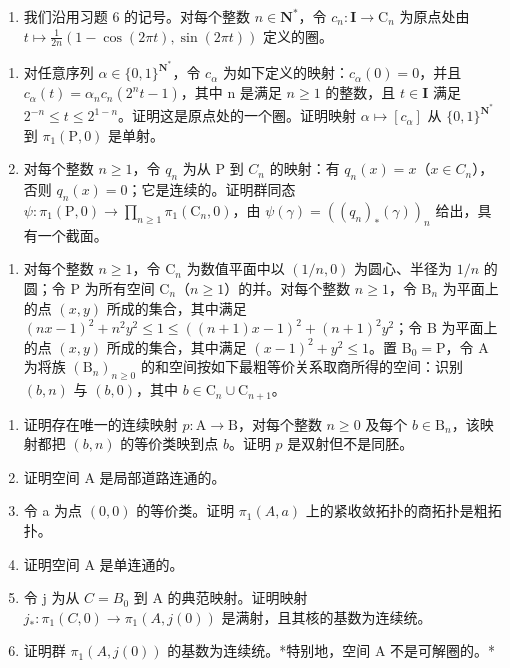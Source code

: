 \begin{enumerate}
\def\labelenumi{\arabic{enumi})}
\setcounter{enumi}{8}
\tightlist
\item
  我们沿用习题 6 的记号。对每个整数 \(n \in \mathbf{N}^*\)，令 \(c_n: \mathbf{I} \to \mathrm{C}_n\) 为原点处由 \(t \mapsto \frac{1}{2n}(1 - \cos(2\pi t), \sin(2\pi t))\) 定义的圈。\\
\end{enumerate}

\begin{enumerate}
\def\labelenumi{\alph{enumi})}
\item
  对任意序列 \(\alpha \in \{0,1\}^{\mathbf{N}^*}\)，令 \(c_\alpha\) 为如下定义的映射：\(c_\alpha(0) = 0\)，并且 \(c_\alpha(t) = \alpha_n c_n (2^n t - 1)\)，其中 n 是满足 \(n \geqslant 1\) 的整数，且 \(t \in \mathbf{I}\) 满足 \(2^{-n} \leqslant t \leqslant 2^{1-n}\)。证明这是原点处的一个圈。证明映射 \(\alpha \mapsto [c_\alpha]\) 从 \(\{0,1\}^{\mathbf{N}^*}\) 到 \(\pi_1(\mathrm{P},0)\) 是单射。
\item
  对每个整数 \(n \geqslant 1\)，令 \(q_{n}\) 为从 P 到 \(C_{n}\) 的映射：有 \(q_{n}(x) = x\)（\(x \in C_{n}\)），否则 \(q_{n}(x) = 0\)；它是连续的。证明群同态 \(\psi: \pi_{1}(\mathrm{P}, 0) \to \prod_{n \geqslant 1} \pi_{1}(\mathrm{C}_{n}, 0)\)，由 \(\psi(\gamma) = ((q_{n})_{*}(\gamma))_{n}\) 给出，具有一个截面。
\end{enumerate}

\begin{enumerate}
\def\labelenumi{\arabic{enumi})}
\setcounter{enumi}{9}
\tightlist
\item
  对每个整数 \(n \geqslant 1\)，令 \(\mathrm{C}_n\) 为数值平面中以 \((1/n,0)\) 为圆心、半径为 \(1/n\) 的圆；令 P 为所有空间 \(\mathrm{C}_n\)（\(n \geqslant 1\)）的并。对每个整数 \(n \geqslant 1\)，令 \(\mathrm{B}_n\) 为平面上的点 \((x,y)\) 所成的集合，其中满足 \((nx-1)^2 + n^2y^2 \leqslant 1 \leqslant ((n+1)x-1)^2 + (n+1)^2y^2\)；令 B 为平面上的点 \((x,y)\) 所成的集合，其中满足 \((x-1)^2 + y^2 \leqslant 1\)。置 \(\mathrm{B}_0 = \mathrm{P}\)，令 A 为将族 \((\mathrm{B}_n)_{n \geqslant 0}\) 的和空间按如下最粗等价关系取商所得的空间：识别 \((b,n)\) 与 \((b,0)\)，其中 \(b \in \mathrm{C}_n \cup \mathrm{C}_{n+1}\)。
\end{enumerate}

\begin{enumerate}
\def\labelenumi{\alph{enumi})}
\item
  证明存在唯一的连续映射 \(p \colon \mathrm{A} \to \mathrm{B}\)，对每个整数 \(n \geqslant 0\) 及每个 \(b \in \mathrm{B}_n\)，该映射都把 \((b, n)\) 的等价类映到点 \(b\)。证明 \(p\) 是双射但不是同胚。
\item
  证明空间 A 是局部道路连通的。
\item
  令 a 为点 \((0,0)\) 的等价类。证明 \(\pi_{1}(A,a)\) 上的紧收敛拓扑的商拓扑是粗拓扑。
\item
  证明空间 A 是单连通的。
\item
  令 j 为从 \(C = B_{0}\) 到 A 的典范映射。证明映射 \(j_{*} \colon \pi_{1}(C,0) \to \pi_{1}(A,j(0))\) 是满射，且其核的基数为连续统。
\item
  证明群 \(\pi_{1}(A,j(0))\) 的基数为连续统。*特别地，空间 A 不是可解圈的。*
\end{enumerate}

